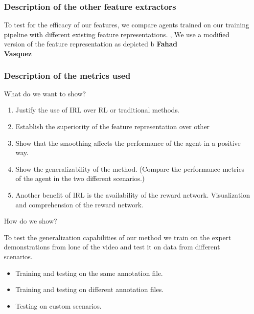 \subsubsection*{Description of the other feature extractors}
To test for the efficacy of our features, we compare agents trained on our training pipeline with different existing feature representations. \cite{fahadLearningHowPedestrians2018a}, \cite{vasquezInverseReinforcementLearning2014a} We use a modified version of the feature representation as depicted b
\textbf{Fahad}\\

\textbf{Vasquez}\\

\subsubsection*{Description of the metrics used}
What do we want to show? 
\begin{enumerate}
	\item Justify the use of IRL over RL or traditional methods.
	\item Establish the superiority of the feature representation over other
	\item Show that the smoothing affects the performance of the agent in a positive way.
	\item Show the generalizability of the method. (Compare the performance metrics of the agent in the two different scenarios.)
	\item Another benefit of IRL is the availability of the reward network. Visualization and comprehension of the reward network. 
\end{enumerate}
How do we show?

To test the generalization capabilities of our method we train on the expert demonstrations from lone of the video and test it on data from different scenarios.

\begin{itemize}
        \item Training and testing on the same annotation file.
        \item Training and testing on different annotation files.
        \item Testing on custom scenarios.
\end{itemize}

